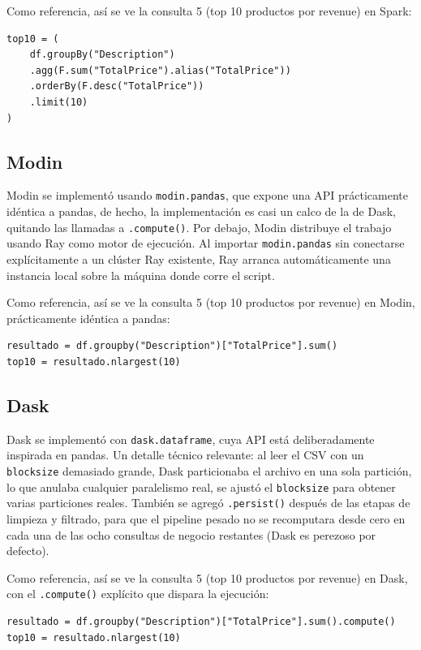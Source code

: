 Como referencia, así se ve la consulta 5 (top 10 productos por revenue) en Spark:

\begin{verbatim}
top10 = (
    df.groupBy("Description")
    .agg(F.sum("TotalPrice").alias("TotalPrice"))
    .orderBy(F.desc("TotalPrice"))
    .limit(10)
)
\end{verbatim}

\subsection{Modin}

Modin se implementó usando \texttt{modin.pandas}, que expone una API prácticamente idéntica a pandas, de hecho, la implementación es casi un calco de la de Dask, quitando las llamadas a \texttt{.compute()}. Por debajo, Modin distribuye el trabajo usando Ray como motor de ejecución. Al importar \texttt{modin.pandas} sin conectarse explícitamente a un clúster Ray existente, Ray arranca automáticamente una instancia local sobre la máquina donde corre el script.

Como referencia, así se ve la consulta 5 (top 10 productos por revenue) en Modin, prácticamente idéntica a pandas:

\begin{verbatim}
resultado = df.groupby("Description")["TotalPrice"].sum()
top10 = resultado.nlargest(10)
\end{verbatim}

\subsection{Dask}

Dask se implementó con \texttt{dask.dataframe}, cuya API está deliberadamente inspirada en pandas. Un detalle técnico relevante: al leer el CSV con un \texttt{blocksize} demasiado grande, Dask particionaba el archivo en una sola partición, lo que anulaba cualquier paralelismo real, se ajustó el \texttt{blocksize} para obtener varias particiones reales. También se agregó \texttt{.persist()} después de las etapas de limpieza y filtrado, para que el pipeline pesado no se recomputara desde cero en cada una de las ocho consultas de negocio restantes (Dask es perezoso por defecto).

Como referencia, así se ve la consulta 5 (top 10 productos por revenue) en Dask, con el \texttt{.compute()} explícito que dispara la ejecución:

\begin{verbatim}
resultado = df.groupby("Description")["TotalPrice"].sum().compute()
top10 = resultado.nlargest(10)
\end{verbatim}

